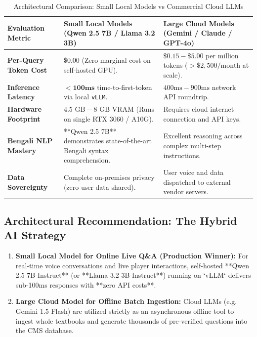 \begin{table}[htbp]
\centering
\footnotesize
\begin{tabular}{|l|p{5.5cm}|p{5.8cm}|}
\hline
\rowcolor{primaryBlue!15}
\textbf{Evaluation Metric} & \textbf{Small Local Models (Qwen 2.5 7B / Llama 3.2 3B)} & \textbf{Large Cloud Models (Gemini / Claude / GPT-4o)} \\ \hline
\textbf{Per-Query Token Cost} & $\mathbf{\$0.00}$ (Zero marginal cost on self-hosted GPU). & $\$0.15 - \$5.00$ per million tokens ($>\$2,500/\text{month}$ at scale). \\ \hline
\textbf{Inference Latency} & $\mathbf{< 100\text{ms}}$ time-to-first-token via local \texttt{vLLM}. & $400\text{ms} - 900\text{ms}$ network API roundtrip. \\ \hline
\textbf{Hardware Footprint} & $4.5\text{ GB} - 8\text{ GB}$ VRAM (Runs on single RTX 3060 / A10G). & Requires cloud internet connection and API keys. \\ \hline
\textbf{Bengali NLP Mastery} & **Qwen 2.5 7B** demonstrates state-of-the-art Bengali syntax comprehension. & Excellent reasoning across complex multi-step instructions. \\ \hline
\textbf{Data Sovereignty} & Complete on-premises privacy (zero user data shared). & User voice and data dispatched to external vendor servers. \\ \hline
\end{tabular}
\caption{Architectural Comparison: Small Local Models vs Commercial Cloud LLMs}
\end{table}

\subsection{Architectural Recommendation: The Hybrid AI Strategy}
\begin{enumerate}
    \item \textbf{Small Local Model for Online Live Q\&A (Production Winner):} For real-time voice conversations and live player interactions, self-hosted **Qwen 2.5 7B-Instruct** (or **Llama 3.2 3B-Instruct**) running on `vLLM` delivers sub-100ms responses with **zero API costs**.
    \item \textbf{Large Cloud Model for Offline Batch Ingestion:} Cloud LLMs (e.g. Gemini 1.5 Flash) are utilized strictly as an asynchronous offline tool to ingest whole textbooks and generate thousands of pre-verified questions into the CMS database.
\end{enumerate}

